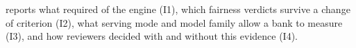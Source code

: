  reports what  required of the engine (I1),  which fairness verdicts survive a change of criterion (I2),  what serving mode and model family allow a bank to measure (I3), and  how reviewers decided with and without this evidence (I4).

